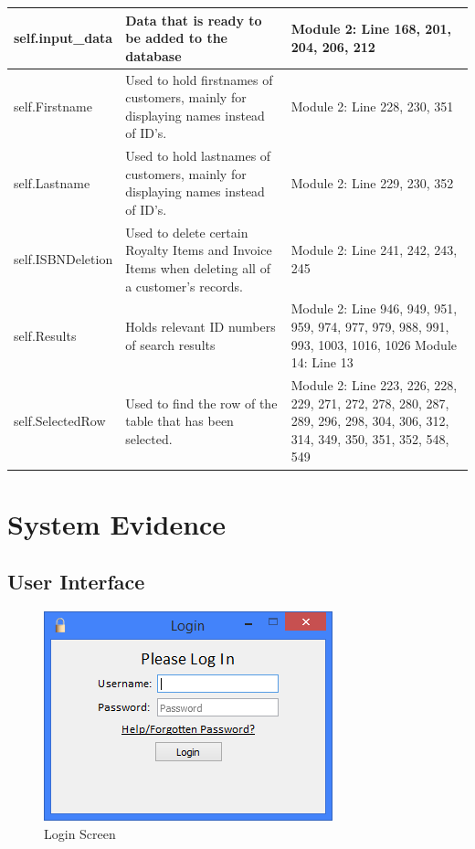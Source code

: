 \begin{center}
\begin{tabular}{|p{3cm}|p{4cm}|p{3cm}|}
    \hline
    self.input\_data & Data that is ready to be added to the database & Module 2: Line 168, 201, 204, 206, 212 \\ \hline
    self.Firstname & Used to hold firstnames of customers, mainly for displaying names instead of ID's. & Module 2: Line 228, 230, 351 \\ \hline
    self.Lastname & Used to hold lastnames of customers, mainly for displaying names instead of ID's. & Module 2: Line 229, 230, 352 \\ \hline
    self.ISBNDeletion & Used to delete certain Royalty Items and Invoice Items when deleting all of a customer's records. & Module 2: Line 241, 242, 243, 245 \\ \hline
    self.Results & Holds relevant ID numbers of search results & Module 2: Line 946, 949, 951, 959, 974, 977, 979, 988, 991, 993, 1003, 1016, 1026 \newline Module 14: Line 13 \\ \hline
    self.SelectedRow & Used to find the row of the table that has been selected. & Module 2: Line 223, 226, 228, 229, 271, 272, 278, 280, 287, 289, 296, 298, 304, 306, 312, 314, 349, 350, 351, 352, 548, 549 \\ \hline
    \hline
\end{tabular}
\end{center}

\section{System Evidence}

\subsection{User Interface}

\begin{figure}[H]
    \caption{Login Screen} \label{fig:LoginScreen}
    \includegraphics[width=\textwidth]{./Maintenance/UserInterface/LoginScreen.png}
\end{figure}


